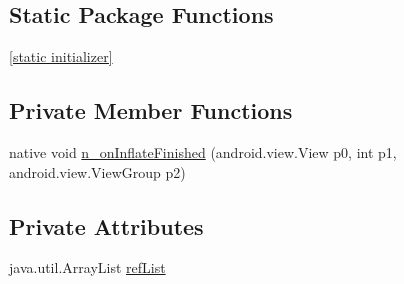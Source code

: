 \subsection*{Static Package Functions}
\begin{CompactItemize}
\item 
\hyperlink{classmono_1_1android_1_1support_1_1v4_1_1view_1_1_async_layout_inflater___on_inflate_finished_listener_implementor_5aab33f34961052674622db091a0bf8a}{\mbox{[}static initializer\mbox{]}}
\end{CompactItemize}
\subsection*{Private Member Functions}
\begin{CompactItemize}
\item 
native void \hyperlink{classmono_1_1android_1_1support_1_1v4_1_1view_1_1_async_layout_inflater___on_inflate_finished_listener_implementor_a5ee4862d015e382a89c419e7a78b528}{n\_\-onInflateFinished} (android.view.View p0, int p1, android.view.ViewGroup p2)
\end{CompactItemize}
\subsection*{Private Attributes}
\begin{CompactItemize}
\item 
java.util.ArrayList \hyperlink{classmono_1_1android_1_1support_1_1v4_1_1view_1_1_async_layout_inflater___on_inflate_finished_listener_implementor_ca8919b12aa30c167a769a16682f3b12}{refList}
\end{CompactItemize}


